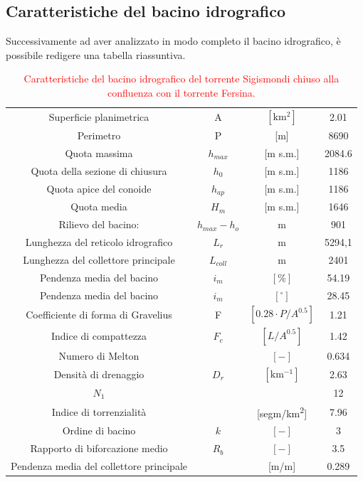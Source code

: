 \subsection{Caratteristiche del bacino idrografico}
Successivamente ad aver analizzato in modo completo il bacino idrografico, è possibile redigere una tabella riassuntiva.
\begin{table}[H] \centering
    \caption{\textcolor{red}{Caratteristiche del bacino idrografico  del torrente Sigismondi chiuso alla confluenza con il torrente Fersina.}}
    \label{tab:caratteristiche_bacino}
    \begin{tabular}{ cccc } 
    \toprule
    Superficie planimetrica & A &  $\left[\si{\kilo\square\meter}\right]$ & 2.01 \\ 
    Perimetro & P & [\unit{m}]        &      8690       \\ 
    Quota massima & $h_{max}$&  [m s.m.]       &    2084.6     \\
    Quota della sezione di chiusura & $h_0$ & [m s.m.] &    1186      \\ 
    Quota apice del conoide &$h_{ap}$& [m s.m.]& 1186\\ 
    Quota media& $H_m$ & [m s.m.]& 1646    \\ 
    Rilievo del bacino:& $h_{max} - h_o$ & \unit{m} &   901 \\ 
    Lunghezza del reticolo idrografico& $L_r$& \unit{m} & 5294,1 \\ 
    Lunghezza del collettore principale& $L_{coll}$& \unit{m} & 2401 \\ 
    Pendenza media del bacino& $i_m$ & $\left[\%\right]$ & 54.19    \\ 
    Pendenza media del bacino& $i_m$& $\left[ ^\circ \right]$ & 28.45   \\ 
    Coefficiente di forma di Gravelius& F& $\left[0.28 \cdot P/A^{0.5} \right]$ & 1.21\\  
    Indice di compattezza &$F_c$  & $ \left[L/A^{0.5}\right]$ & 1.42\\ 
    Numero di Melton& & $\left[-\right]$ & 0.634\\ 
    Densità di drenaggio &$D_r$& $\left[\si{\km^{-1}}\right]$& 2.63 \\ 
    $N_1$& & & 12 \\ 
    Indice di torrenzialità& & [\unit{segm/km^2}] & 7.96 \\  
    Ordine di bacino& $k$ & $\left[-\right]$ & 3 \\ 
    Rapporto di biforcazione medio& $R_b$ & $\left[-\right]$ &  3.5 \\  
    Pendenza media del collettore principale & & [\unit{m/m}] & 0.289\\  
    \bottomrule
\end{tabular}
\end{table}
